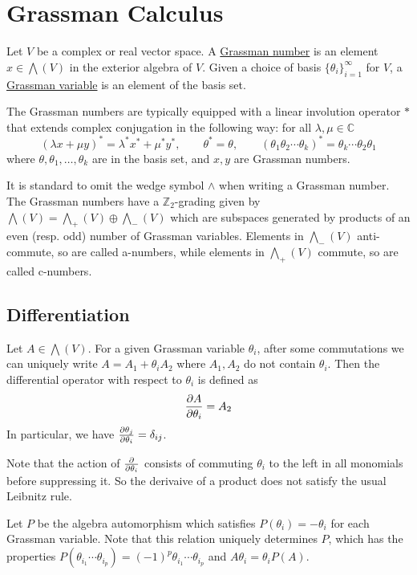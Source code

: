 \chapter{Grassman Calculus} 
\label{appendix2}
\begin{defn}
	Let $V$ be a complex or real vector space.
	A \underline{Grassman number} is an element $x\in
	\bigwedge(V)$ in the exterior algebra of $V$.
	Given a choice of basis $\{\theta_i\}_{i=1}^{\infty}$ for $V$, a
	\underline{Grassman variable} is an element of the basis set.

	The Grassman numbers are typically equipped with a linear involution operator
	$*$ that extends complex conjugation in the following way: for all
	$\lambda,\mu\in\mathbb{C}$	
	\[
	(\lambda x + \mu y)^* = \lambda^* x^* + \mu^*y^*,	\qquad
	\theta^* = \theta, \qquad
	(\theta_1\theta_2\cdots\theta_k)^*=\theta_k\cdots\theta_2\theta_1
	\] 
	where $\theta,\theta_1,\ldots,\theta_k$ are in the basis set, and $x,y$ are
	Grassman numbers.
\end{defn}

It is standard to omit the wedge symbol $\wedge$ when writing a Grassman number.
The Grassman numbers have a $\mathbb{Z}_2$-grading given by $\bigwedge(V) =
\bigwedge_+(V) \oplus \bigwedge_-(V)$ which are subspaces generated by products
of an even (resp. odd) number of Grassman variables. Elements in
$\bigwedge_-(V)$ anti-commute, so are called a-numbers, while elements in 
$\bigwedge_+(V)$ commute, so are called c-numbers.

\section{Differentiation}
Let $A\in \bigwedge(V)$. For a given Grassman variable  $\theta_i$, after some
commutations we can uniquely write $A = A_1 + \theta_iA_2$ where $A_1,A_2$ do not
contain $\theta_i$. Then the differential operator with respect to $\theta_i$ is
defined as
\[
\pdv{A}{\theta_i} = A_2
\] 
In particular, we have $\pdv{\theta_j}{\theta_i} = \delta_{ij}$.

Note that the action of $\pdv{}{\theta_i}$ consists of commuting $\theta_i$ to
the left in all monomials before suppressing it. So the
derivaive of a product does not satisfy the usual Leibnitz rule.

Let $P$ be the algebra automorphism which satisfies $P(\theta_i)=-\theta_i$ for
each Grassman variable. Note that this relation uniquely determines  $P$,
which has the properties
$P(\theta_{i_1}\cdots\theta_{i_p})=(-1)^p\theta_{i_1}\cdots\theta_{i_p}$ and  
$A\theta_i = \theta_iP(A)$.

